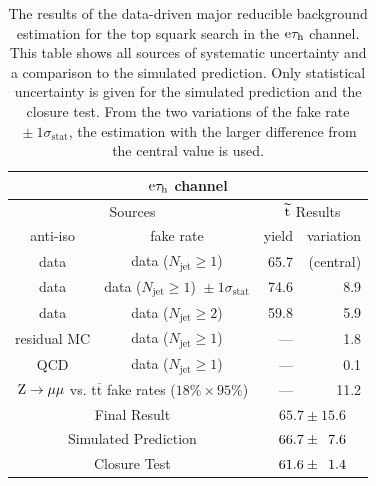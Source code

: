\documentclass[12pt]{thesis}  %
\newcommand{\tauh}{\ensuremath{\tau_{\text{h}}}\xspace}
\newcommand{\Pe}{\ensuremath{\cmsSymbolFace{e}}\xspace}
\newcommand{\etau}{\ensuremath{\Pe\tauh}\xspace}
\renewcommand{\ttbar}{\ensuremath{\mathrm{t}\overline{\mathrm{t}}}\xspace}
\newcommand{\ra}{\ensuremath{\rightarrow}}%
\newcommand{\Zmm}{\ensuremath{\Z \ra \mu\mu}\xspace}%
\begin{document}
\begin{table}[hbt]
  \begin{center}
    \begin{tabular}{|c|c|r|r|}
      \multicolumn{4}{c}{\etau channel} \\
      \hline
      \multicolumn{2}{|c|}{Sources} & \multicolumn{2}{|c|}{$\widetilde{\mathrm{t}}$ Results} \\
      \hline
      anti-iso    & fake rate                                                  & \multicolumn{1}{c|}{yield}  & \multicolumn{1}{c|}{variation} \\
      \hline
      data        & data ($N_{\text{jet}} \geq 1$)                               & 65.7 & (central) \\
      data        & data ($N_{\text{jet}} \geq 1$) ${}\pm 1\sigma_{\text{stat}}$ & 74.6 & 8.9 \\
      data        & data ($N_{\text{jet}} \geq 2$)                               & 59.8 & 5.9   \\
      residual MC & data ($N_{\text{jet}} \geq 1$)                               & ---  & 1.8      \\
      QCD         & data ($N_{\text{jet}} \geq 1$)                               & ---  & 0.1 \\
      \multicolumn{2}{|c|}{\Zmm vs. \ttbar fake rates ($18\%\times95\%$)}        & ---  & 11.2 \\
      \hline
      \multicolumn{2}{|c|}{Final Result}         & \multicolumn{2}{c|}{$65.7 \pm 15.6$}\\
      \multicolumn{2}{|c|}{Simulated Prediction} & \multicolumn{2}{c|}{$66.7 \pm \hphantom{1}7.6$} \\
      \multicolumn{2}{|c|}{Closure Test}         & \multicolumn{2}{c|}{$61.6 \pm \hphantom{1}1.4$} \\
      \hline
    \end{tabular}
    \caption{The results of the data-driven major reducible background estimation for the top squark search in the \etau channel. This table shows all sources of systematic uncertainty and a comparison to the simulated prediction. Only statistical uncertainty is given for the simulated prediction and the closure test. From the two variations of the fake rate ${}\pm 1\sigma_{\text{stat}}$, the estimation with the larger difference from the central value is used.}
    \label{Bkg:tab:faketauresultsetauLQD}
  \end{center}
\end{table}
\end{document}
